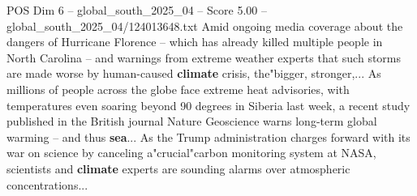 \begin{textsample}{POS Dim 6 – global\_south\_2025\_04 – Score 5.00 – global\_south\_2025\_04/124013648.txt}
Amid ongoing media coverage about the dangers of Hurricane Florence -- which has already killed multiple people in North Carolina -- and warnings from extreme weather experts that such storms are made worse by human-caused \textbf{climate} crisis, the"bigger, stronger,...
As millions of people across the globe face extreme heat advisories, with temperatures even soaring beyond 90 degrees in Siberia last week, a recent study published in the British journal Nature Geoscience warns long-term global warming -- and thus \textbf{sea}...
As the Trump administration charges forward with its war on science by canceling a"crucial"carbon monitoring system at NASA, scientists and \textbf{climate} experts are sounding alarms over atmospheric concentrations...

\end{textsample}

